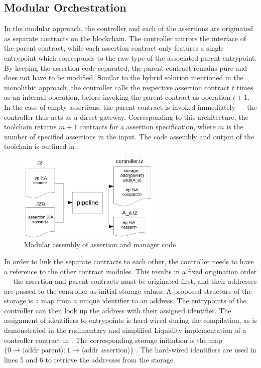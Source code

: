 \subsection{Modular Orchestration}\label{sec:modular}
In the modular approach, the controller and each of the assertions are originated as separate contracts on the blockchain. The controller mirrors the interface of the parent contract, while each assertion contract only features a single entrypoint which corresponds to the raw type of the associated parent entrypoint. By keeping the assertion code separated, the parent contract remains pure and does not have to be modified. Similar to the hybrid solution mentioned in the monolithic approach, the controller calls the respective assertion contract $t$ times as an internal operation, before invoking the parent contract as operation $t+1$. In the case of empty assertions, the parent contract is invoked immediately --- the controller thus acts as a direct gateway. Corresponding to this architecture, the toolchain returns $m + 1$ contracts for a assertion specification, where $m$ is the number of specified assertions in the input. The code assembly and output of the toolchain is outlined in .
\begin{figure}[h]
\centering
  \includegraphics[width=0.6\textwidth]{figures/5-offline_tezos/pipeline_output_modular.png}
	\caption{Modular assembly of assertion and manager code}
	\label{fig:modular_assembly}
\end{figure}

In order to link the separate contracts to each other, the controller needs to have a reference to the other contract modules. This results in a fixed origination order --- the assertion and parent contracts must be originated first, and their addresses are passed to the controller as initial storage values. A proposed structure of the storage is a map from a unique identifier to an address. The entrypoints of the controller can then look up the address with their assigned identifier. The assignment of identifiers to entrypoints is hard-wired during the compilation, as is demonstrated in the rudimentary and simplified Liquidity implementation of a controller contract in . The corresponding storage initiation is the map $\lbrace 0 \rightarrow \langle \text{addr parent} \rangle; 1 \rightarrow \langle \text{addr assertion} \rangle \rbrace$ . The hard-wired identifiers are used in lines 5 and 6 to retrieve the addresses from the storage.



